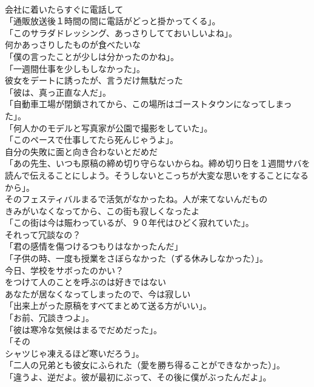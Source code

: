 \documentclass[8pt]{extreport}
\begin{document}
\begin{CJK}{UTF8}{min}
\\	会社に着いたらすぐに電話して	
\\	「通販放送後１時間の間に電話がどっと掛かってくる」。	
\\	「このサラダドレッシング、あっさりしてておいしいよね」。	
\\	何かあっさりしたものが食べたいな	
\\	「僕の言ったことが少しは分かったのかね」。	
\\	「一週間仕事を少しもしなかった」。	
\\	彼女をデートに誘ったが、言うだけ無駄だった	
\\	「彼は、真っ正直な人だ」。	
\\	「自動車工場が閉鎖されてから、この場所はゴーストタウンになってしまった」。	
\\	「何人かのモデルと写真家が公園で撮影をしていた」。	
\\	「このペースで仕事してたら死んじゃうよ」。	
\\	自分の失敗に面と向き合わないとだめだ	
\\	「あの先生、いつも原稿の締め切り守らないからね。締め切り日を１週間サバを読んで伝えることにしよう。そうしないとこっちが大変な思いをすることになるから」。	
\\	そのフェスティバルまるで活気がなかったね。人が来てないんだもの	
\\	きみがいなくなってから、この街も寂しくなったよ	
\\	「この街は今は賑わっているが、９０年代はひどく寂れていた」。	
\\	それって冗談なの？	
\\	「君の感情を傷つけるつもりはなかったんだ」	
\\	「子供の時、一度も授業をさぼらなかった（ずる休みしなかった）」。	
\\	今日、学校をサボったのかい？	
\\	をつけて人のことを呼ぶのは好きではない	
\\	あなたが居なくなってしまったので、今は寂しい	
\\	「出来上がった原稿をすべてまとめて送る方がいい」。	
\\	「お前、冗談きつよ」。	
\\	「彼は寒冷な気候はまるでだめだった」。	
\\	「その
\\	シャツじゃ凍えるほど寒いだろう」。	
\\	「二人の兄弟とも彼女にふられた（愛を勝ち得ることができなかった）」。	
\\	「違うよ、逆だよ。彼が最初にぶって、その後に僕がぶったんだよ」。	

\end{CJK}
\end{document}
